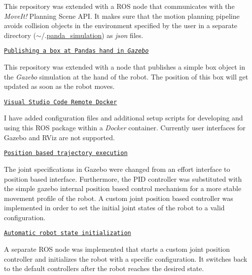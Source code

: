 This repository was extended with a R\+OS node that communicates with the {\itshape Move\+It!} Planning Scene A\+PI. It makes sure that the motion planning pipeline avoids collision objects in the environment specified by the user in a separate directory ({\ttfamily $\sim$/.\hyperlink{namespacepanda__simulation}{panda\+\_\+simulation}}) as {\itshape json} files.

\href{https://erdalpekel.de/?p=123}{\tt Publishing a box at Panda\textquotesingle{}s hand in {\itshape Gazebo}}

This repository was extended with a node that publishes a simple box object in the {\itshape Gazebo} simulation at the hand of the robot. The position of this box will get updated as soon as the robot moves.

\href{https://erdalpekel.de/?p=123}{\tt Visual Studio Code Remote Docker}

I have added configuration files and additional setup scripts for developing and using this R\+OS package within a {\itshape Docker} container. Currently user interfaces for Gazebo and R\+Viz are not supported.

\href{https://erdalpekel.de/?p=285}{\tt Position based trajectory execution}

The joint specifications in Gazebo were changed from an effort interface to position based interface. Furthermore, the P\+ID controller was substituted with the simple gazebo internal position based control mechanism for a more stable movement profile of the robot. A custom joint position based controller was implemented in order to set the initial joint states of the robot to a valid configuration.

\href{https://erdalpekel.de/?p=314}{\tt Automatic robot state initialization}

A separate R\+OS node was implemented that starts a custom joint position controller and initializes the robot with a specific configuration. It switches back to the default controllers after the robot reaches the desired state.

 